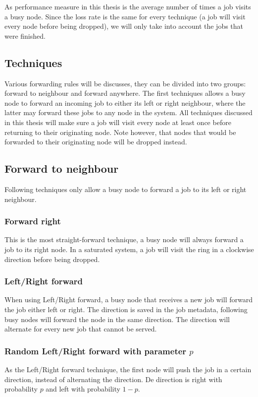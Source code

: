 \documentclass[10pt,a4paper]{article}
\begin{document}
As performance measure in this thesis is the average number of times a job visits a busy node. Since the loss rate is the same for every technique (a job will visit every node before being dropped), we will only take into account the jobs that were finished.

\subsection{Techniques}
\label{techniques}
Various forwarding rules will be discusses, they can be divided into two groups: forward to neighbour and forward anywhere. The first techniques allows a busy node to forward an incoming job to either its left or right neighbour, where the latter may forward these jobs to any node in the system. All techniques discussed in this thesis will make sure a job will visit every node at least once before returning to their originating node. Note however, that nodes that would be forwarded to their originating node will be dropped instead.

\subsection{Forward to neighbour}
Following techniques only allow a busy node to forward a job to its left or right neighbour.

\subsubsection{Forward right}
This is the most straight-forward technique, a busy node will always forward a job to its right node. In a saturated system, a job will visit the ring in a clockwise direction before being dropped.

\subsubsection{Left/Right forward}
When using Left/Right forward, a busy node that receives a new job will forward the job either left or right. The direction is saved in the job metadata, following busy nodes will forward the node in the same direction. The direction will alternate for every new job that cannot be served.

\subsubsection{Random Left/Right forward with parameter $p$}
As the Left/Right forward technique, the first node will push the job in a certain direction, instead of alternating the direction. De direction is right with probability $p$ and left with probability $1-p$.
\end{document}
